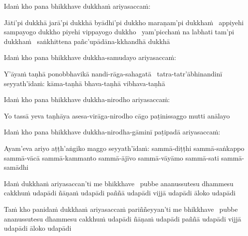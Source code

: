 \begin{pali-hang}
  Idaṁ kho pana bhikkhave dukkhaṁ ariyasaccaṁ:
\end{pali-hang}

\begin{pali-hang}
  Jāti'pi dukkhā jarā'pi dukkhā byādhi'pi dukkho maraṇam'pi dukkhaṁ \breathmark\ appiyehi sampayogo dukkho piyehi vippayogo dukkho \breathmark\ yam'picchaṁ na labhati tam'pi dukkhaṁ \breathmark\ saṅkhittena pañc'upādāna-kkhandhā dukkhā
\end{pali-hang}

\begin{pali-hang}
  Idaṁ kho pana bhikkhave dukkha-samudayo ariyasaccaṁ:
\end{pali-hang}

\begin{pali-hang}
  Y'āyaṁ taṇhā ponobbhavikā nandi-rāga-sahagatā \breathmark\ tatra-tatr'ābhinandinī seyyath'īdaṁ: kāma-taṇhā bhava-taṇhā vibhava-taṇhā
\end{pali-hang}

\begin{pali-hang}
  Idaṁ kho pana bhikkhave dukkha-nirodho ariyasaccaṁ:
\end{pali-hang}

\begin{pali-hang}
  Yo tassā yeva taṇhāya asesa-virāga-nirodho cāgo paṭinissaggo mutti anālayo
\end{pali-hang}

\begin{pali-hang}
  Idaṁ kho pana bhikkhave dukkha-nirodha-gāminī paṭipadā ariyasaccaṁ:
\end{pali-hang}

\begin{pali-hang}
  Ayam'eva ariyo aṭṭh'aṅgiko maggo seyyath'īdaṁ: sammā-diṭṭhi sammā-saṅkappo sammā-vācā sammā-kammanto sammā-ājīvo sammā-vāyāmo sammā-sati sammā-samādhi
\end{pali-hang}

\begin{pali-hang}
  Idaṁ dukkhaṁ ariyasaccan'ti me bhikkhave \breathmark\ pubbe ananussutesu dhammesu cakkhuṁ udapādi ñāṇaṁ udapādi paññā udapādi vijjā udapādi āloko udapādi
\end{pali-hang}

\begin{pali-hang}
  Taṁ kho panidaṁ dukkhaṁ ariyasaccaṁ pariññeyyan'ti me bhikkhave \breathmark\ pubbe ananussutesu dhammesu cakkhuṁ udapādi ñāṇaṁ udapādi paññā udapādi vijjā udapādi āloko udapādi
\end{pali-hang}

